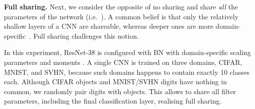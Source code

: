 \documentclass[10pt,twocolumn,letterpaper]{article}
\renewcommand{\paragraph}[1]{\par\medskip\noindent\textbf{#1}}
\begin{document}
\begin{table*}
\centering
{}
  \caption{Top-1 error rate(\%) for various tasks. The table shows the results in case of no feature sharing between different domains (first row), deep feature sharing of all convolutional weights (deep), partial sharing for selected convolutional weights in block 1-3 and block 2-4 and deep sharing with more convolutional filters ( and  number of filters). }
 \label{tab:multismall}

\end{table*}

 
\paragraph{Full sharing.} Next, we consider the opposite of no sharing and share \emph{all} the parameters of the network (i.e.\ ). A common belief is that only the relatively shallow layers of a CNN are shareable, whereas deeper ones are more domain-specific~\cite{lenc15understanding}. Full sharing challenges this notion.

In this experiment, ResNet-38 is configured with BN with domain-specific scaling parameters  and moments .  A single CNN is trained on three domains, CIFAR, MNIST, and SVHN, because such domains happens to contain exactly 10 classes each. Although CIFAR objects and MNIST/SVHN digits have nothing in common, we randomly pair digits with objects. This allows to share  all filter parameters, including the final classification layer, realising full sharing. 
\end{document}
